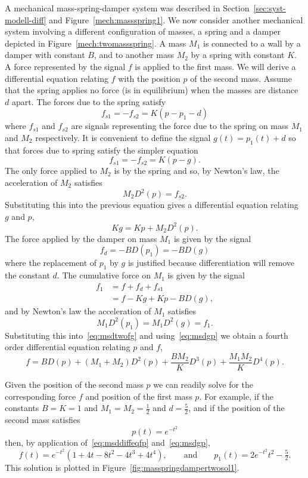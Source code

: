 \documentclass[11pt,a4paper]{book}
\theoremstyle{plain}
\numberwithin{equation}{section}
\begin{document}
A mechanical mass-spring-damper system was described in Section~\ref{sec:syst-modell-diff} and Figure~\ref{mech:massspring1}.  We now consider another mechanical system involving a different configuration of masses, a spring and a damper depicted in Figure~\ref{mech:twomassspring}.  A mass $M_1$ is connected to a wall by a damper with constant $B$, and to another mass $M_2$ by a spring with constant $K$.  A force represented by the signal $f$ is applied to the first mass.  We will derive a differential equation relating $f$ with the position $p$ of the second mass.  Assume that the spring applies no force (is in equilibrium) when the masses are distance $d$ apart.  The forces due to the spring satisfy
\[
f_{s1} = -f_{s2} = K( p - p_1 - d)
\] 
where $f_{s1}$ and $f_{s2}$ are signals representing the force due to the spring on mass $M_1$ and $M_2$ respectively.  It is convenient to define the signal $g(t) = p_1(t) + d$ so that forces due to spring satisfy the simpler equation 
\[
f_{s1} = -f_{s2} = K( p - g ).
\]
The only force applied to $M_2$ is by the spring and so, by Newton's law, the acceleration of $M_2$ satisfies
\[
M_2 D^2(p) = f_{s2}.
\]
Substituting this into the previous equation gives a differential equation relating $g$ and $p$,
\begin{equation}\label{eq:msdgp}
K g = K p + M_2 D^2(p).
\end{equation}
The force applied by the damper on mass $M_1$ is given by the signal
\[
f_d = -B D(p_1) = -B D(g)
\] 
where the replacement of $p_1$ by $g$ is justified because differentiation will remove the constant $d$.  The cumulative force on $M_1$ is given by the signal
\begin{align}
f_1 &= f + f_d + f_{s1} \nonumber \\
&= f - Kg  + Kp - B D(g), \label{eq:msdtwofg}
\end{align}
and by Newton's law the acceleration of $M_1$ satisfies
\[
M_1 D^2(p_1) = M_1 D^2(g) = f_1.
\]
Substituting this into~\eqref{eq:msdtwofg} and using~\eqref{eq:msdgp} we obtain a fourth order differential equation relating $p$ and $f$,
\begin{equation}\label{eq:msddiffeqfp}
f = B D(p) + (M_1+M_2) D^2(p) + \frac{B M_2}{K} D^3(p) + \frac{M_1 M_2}{K} D^4(p).
\end{equation}

Given the position of the second mass $p$ we can readily solve for the corresponding force $f$ and position of the first mass $p$.  For example, if the constants $B=K=1$ and $M_1=M_2=\tfrac{1}{2}$ and $d = \tfrac{5}{2}$, and if the position of the second mass satisfies
\[
p(t) = e^{-t^2}
\]
then, by application of~\eqref{eq:msddiffeqfp} and~\eqref{eq:msdgp},
\[
f(t) = e^{-t^2} (1 + 4t - 8 t^2 - 4 t^3 + 4 t^4 ), \qquad \text{and} \qquad p_1(t) = 2 e^{-t^2} t^2 - \tfrac{5}{2}.
\]
This solution is plotted in Figure~\ref{fig:masspringdampertwosol1}.
\end{document}
